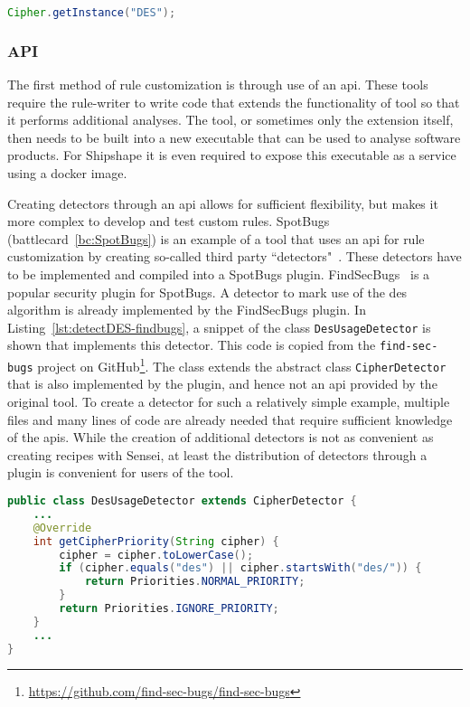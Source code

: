 \begin{lstlisting}[language={Java},caption={Insecure use of a deprecated cryptographic algorithm},label={lst:useDES},float,abovecaptionskip=-0.0pt,xleftmargin=15pt]
Cipher.getInstance("DES");
\end{lstlisting}

\subsubsection{API}
The first method of rule customization is through use of an \gls{api}.
These tools require the rule-writer to write code that extends the functionality of tool so that it performs additional analyses.
The tool, or sometimes only the extension itself, then needs to be built into a new executable that can be used to analyse software products.
For Shipshape it is even required to expose this executable as a service using a docker image.

Creating detectors through an \gls{api} allows for sufficient flexibility, but makes it more complex to develop and test custom rules.
SpotBugs (battlecard~\ref{bc:SpotBugs}) is an example of a tool that uses an \gls{api} for rule customization by creating so-called third party ``detectors"~\cite{spotbugsapi}.
These detectors have to be implemented and compiled into a SpotBugs plugin.
FindSecBugs~\cite{findsecbugs} is a popular security plugin for SpotBugs.
A detector to mark use of the \gls{des} algorithm is already implemented by the FindSecBugs plugin.
In Listing~\ref{lst:detectDES-findbugs}, a snippet of the class \texttt{DesUsageDetector} is shown that implements this detector.
This code is copied from the \texttt{find-sec-bugs} project on GitHub\footnote{\url{https://github.com/find-sec-bugs/find-sec-bugs}}.
The class extends the abstract class \texttt{CipherDetector} that is also implemented by the plugin, and hence not an \gls{api} provided by the original tool.
To create a detector for such a relatively simple example, multiple files and many lines of code are already needed that require sufficient knowledge of the \glspl{api}.
While the creation of additional detectors is not as convenient as creating recipes with Sensei, at least the distribution of detectors through a plugin is convenient for users of the tool.

\begin{lstlisting}[language={Java},caption={Rule customization of SpotBugs is done through java code using their API.},label={lst:detectDES-findbugs},float,abovecaptionskip=-0.0pt,xleftmargin=15pt]
public class DesUsageDetector extends CipherDetector {
    ...
    @Override
    int getCipherPriority(String cipher) {
        cipher = cipher.toLowerCase();
        if (cipher.equals("des") || cipher.startsWith("des/")) {
            return Priorities.NORMAL_PRIORITY;
        }
        return Priorities.IGNORE_PRIORITY;
    }
    ...
}
\end{lstlisting}

